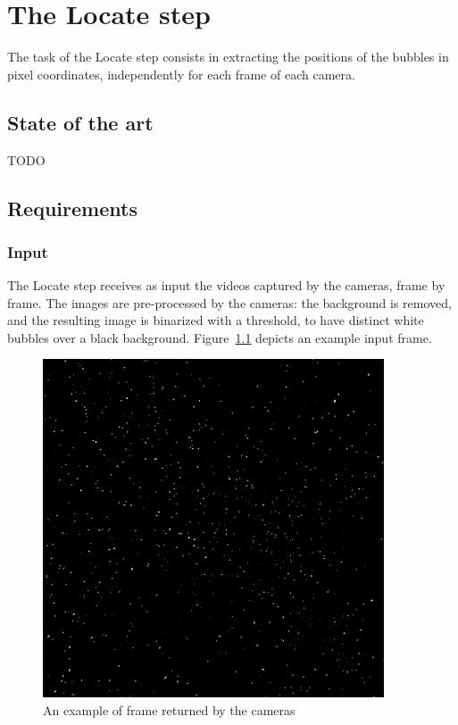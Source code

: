 \chapter{The Locate step}
\label{chap:locate}

\newcommand{\locateimgsize}{0.9\textwidth}

The task of the Locate step consists in extracting the positions of the bubbles in pixel coordinates, independently for each frame of each camera.

\section{State of the art}
TODO
\section{Requirements}

\subsection{Input}
The Locate step receives as input the videos captured by the cameras, frame by frame.
The images are pre-processed by the cameras: the background is removed, and the resulting image is binarized with a threshold, to have distinct white bubbles over a black background.
Figure~\ref{fig:locate:original} depicts an example input frame.

\begin{figure}
	\centerline{\includegraphics[width=\locateimgsize]{images/locate/_original-frame.png}}
	\caption{\centering An example of frame returned by the cameras}
	\label{fig:locate:original}
\end{figure}

